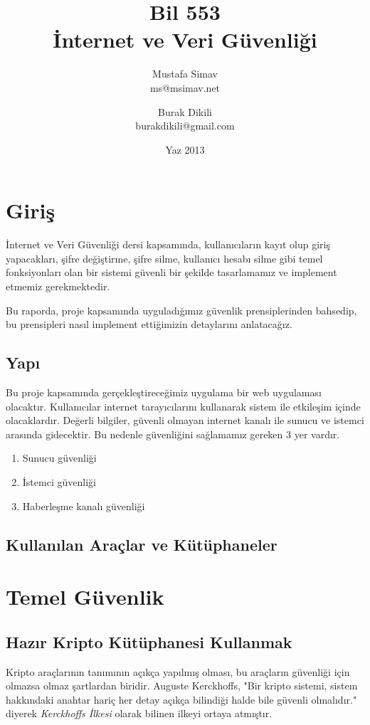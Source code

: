 \documentclass[11pt]{report}
\title{\textbf{Bil 553} \\ İnternet ve Veri Güvenliği}
\author{Mustafa Simav \\
        ms@msimav.net
    \and
        Burak Dikili \\
        burakdikili@gmail.com}
\date{Yaz 2013}
\begin{document}
\maketitle

\chapter{Giriş}

İnternet ve Veri Güvenliği dersi kapsamında, kullanıcıların kayıt olup giriş yapacakları, şifre değiştirme, şifre silme, kullanıcı hesabı silme gibi temel fonksiyonları olan bir sistemi güvenli bir şekilde tasarlamamız ve implement etmemiz gerekmektedir.

Bu raporda, proje kapsamında uyguladığımız güvenlik prensiplerinden bahsedip, bu prensipleri nasıl implement ettiğimizin detaylarını anlatacağız.

\section{Yapı}

Bu proje kapsamında gerçekleştireceğimiz uygulama bir web uygulaması olacaktır. Kullanıcılar internet tarayıcılarını kullanarak sistem ile etkileşim içinde olacaklardır. Değerli bilgiler, güvenli olmayan internet kanalı ile sunucu ve istemci arasında gidecektir. Bu nedenle güvenliğini sağlamamız gereken 3 yer vardır.

\begin{enumerate}
\item Sunucu güvenliği
\item İstemci güvenliği
\item Haberleşme kanalı güvenliği
\end{enumerate}

\section{Kullanılan Araçlar ve Kütüphaneler}

\chapter{Temel Güvenlik}
\section{Hazır Kripto Kütüphanesi Kullanmak}
Kripto araçlarının tanımının açıkça yapılmış olması, bu araçların güvenliği için olmazsa olmaz şartlardan biridir. Auguste Kerckhoffs, "Bir kripto sistemi, sistem hakkındaki anahtar hariç her detay açıkça bilindiği halde bile güvenli olmalıdır."\cite{kerckhoffs} diyerek \emph{Kerckhoffs İlkesi} olarak bilinen ilkeyi ortaya atmıştır.
\end{document}
